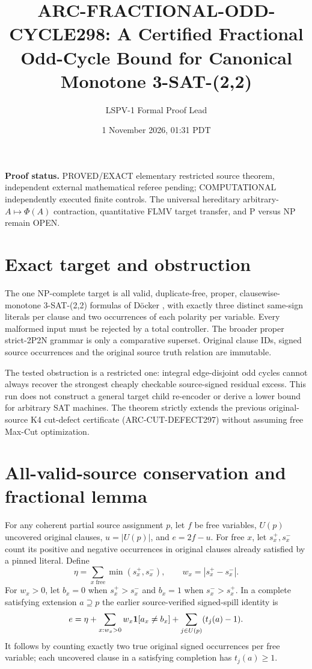 \documentclass[11pt]{article}
\title{ARC-FRACTIONAL-ODD-CYCLE298: A Certified Fractional Odd-Cycle Bound for Canonical Monotone 3-SAT-(2,2)}
\author{LSPV-1 Formal Proof Lead}
\date{1 November 2026, 01:31 PDT}
\begin{document}
\maketitle
\noindent\textbf{Proof status.} PROVED/EXACT elementary restricted source theorem, independent external mathematical referee pending; COMPUTATIONAL independently executed finite controls. The universal hereditary arbitrary-$A\mapsto\Phi(A)$ contraction, quantitative FLMV target transfer, and P versus NP remain OPEN.

\section{Exact target and obstruction}
The one NP-complete target is all valid, duplicate-free, proper, clausewise-monotone 3-SAT-(2,2) formulas of D\"ocker \cite{doecker}, with exactly three distinct same-sign literals per clause and two occurrences of each polarity per variable. Every malformed input must be rejected by a total controller. The broader proper strict-2P2N grammar is only a comparative superset. Original clause IDs, signed source occurrences and the original source truth relation are immutable.

The tested obstruction is a restricted one: integral edge-disjoint odd cycles cannot always recover the strongest cheaply checkable source-signed residual excess. This run does not construct a general target child re-encoder or derive a lower bound for arbitrary SAT machines. The theorem strictly extends the previous original-source K4 cut-defect certificate (ARC-CUT-DEFECT297) without assuming free Max-Cut optimization.

\section{All-valid-source conservation and fractional lemma}
For any coherent partial source assignment $p$, let $f$ be free variables, $U(p)$ uncovered original clauses, $u=|U(p)|$, and $e=2f-u$. For free $x$, let $s_x^+,s_x^-$ count its positive and negative occurrences in original clauses already satisfied by a pinned literal. Define
\[
\eta=\sum_{x\text{ free}}\min(s_x^+,s_x^-),\qquad
w_x=|s_x^+-s_x^-|.
\]
For $w_x>0$, let $b_x=0$ when $s_x^+>s_x^-$ and $b_x=1$ when $s_x^->s_x^+$. In a complete satisfying extension $a\supseteq p$ the earlier source-verified signed-spill identity is
\begin{equation}\label{eq:budget}
e=\eta+\sum_{x:w_x>0}w_x{\bf1}[a_x\neq b_x]
 +\sum_{j\in U(p)}(t_j(a)-1).
\end{equation}
It follows by counting exactly two true original signed occurrences per free variable; each uncovered clause in a satisfying completion has $t_j(a)\ge1$.
\end{document}
